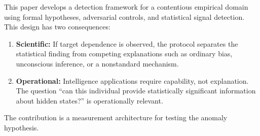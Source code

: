 \documentclass[11pt,letterpaper]{article}
\begin{document}
This paper develops a detection framework for a contentious empirical domain using formal hypotheses, adversarial controls, and statistical signal detection. This design has two consequences:

\begin{enumerate}[nosep]
    \item \textbf{Scientific:} If target dependence is observed, the protocol separates the statistical finding from competing explanations such as ordinary bias, unconscious inference, or a nonstandard mechanism.
    \item \textbf{Operational:} Intelligence applications require capability, not explanation. The question ``can this individual provide statistically significant information about hidden states?'' is operationally relevant.
\end{enumerate}

The contribution is a measurement architecture for testing the anomaly hypothesis.
\end{document}
